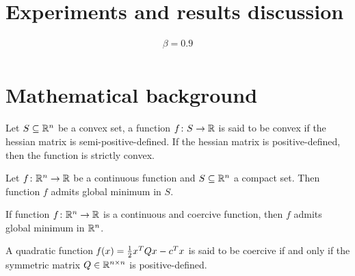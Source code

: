 \section{Experiments and results discussion}

\[
\begin{array}{l}
\beta=0.9 \\
\end{array}
\]



\cleardoublepage
\section{Mathematical background}

\begin{defs}\label{def:conv_fun}
	Let $S\subseteq\mathbb{R}^n$ be a convex set, a function $f\colon S\to\mathbb{R}$ is said to be convex if the hessian matrix is semi-positive-defined. If the hessian matrix is positive-defined, then the function is strictly convex.
\end{defs}

\begin{thm}\label{thm:weirs}
	Let $f\colon\mathbb{R}^n\to\mathbb{R}$ be a continuous function and $S\subseteq\mathbb{R}^n$ a compact set. Then function $f$ admits global minimum in $S$.
\end{thm}

\begin{cor}\label{cor:weirs1}
	If function $f\colon\mathbb{R}^n\to\mathbb{R}$ is a continuous and coercive function, then $f$ admits global minimum in $\mathbb{R}^n$.
\end{cor}

\begin{prop}
	A quadratic function $\operatorname*{\mathit{f}}(x)=\frac{1}{2}x^TQx-c^Tx$ is said to be coercive if and only if the symmetric matrix $Q\in\mathbb{R}^{n\times n}$ is positive-defined.
\end{prop}

